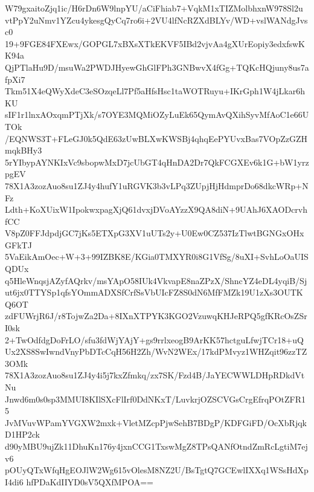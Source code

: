 W79gxaitoZjq1ic/H6rDn6W9lnpYU/aCiFhiab7+VqkM1xTIZMolbhxnW978Sl2u
vtPpY2uNmv1YZcu4ykesgQyCq7ro6i+2VU4lfNcRZXdBLYv/WD+vslWANdgJvsc0
19+9FGE84FXEwx/GOPGL7xBXsXTkEKVF5IBd2vjvAa4gXUrEopiy3edxfswKK94a
QjPTlaHu9D/msuWa2PWDJHyewGhGlFPh3GNBwvX4fGg+TQKcHQjuny8us7afpXi7
Tkm51X4eQWyXdeC3eSOzqeLl7Pf5aHfsHsc1taWOTRuyu+IKrGph1W4jLkar6hKU
sIF1r1lnxAOxqmPTjXk/s7OYE3MQMiOZyLuEk65QymAvQXihSyvMfAoC1e66UTOk
/EQNWS3T+FLeGJ0k5QdE63zUwBLXwKWSBj4qhqEePYUvxBas7VOpZzGZHmqkBHy3
5rYIbypAYNKIxVc9sbopwMxD7jcUbGT4qHnDA2Dr7QkFCGXEv6k1G+bW1yrzpgEV
78X1A3zozAuo8su1ZJ4y4hufY1uRGVK3b3vLPq3ZUpjHjHdmprDo68dkcWRp+NFz
Ldth+KoXUixW1IpokwxpagXjQ61dvxjDVoAYzzX9QA8diN+9UAhJ6XAODcrvhfCC
V8pZ0FFJdpdjGC7jKs5ETXpG3XV1uUTs2y+U0Ew0CZ537IzTlwtBGNGxOHxGFkTJ
5VaEikAmOec+W+3+99IZBK8E/KGia0TMXYR0i8G1VfSg/8uXI+SvhLoOaUISQDUx
q5HleWnqsjAZyfAQrkv/msYApO58IUk4VkvapE8naZPzX/ShncYZ4eDL4yqiB/Sj
ut6jx0TTYSp1qfsYOmmADXSfCrfSsVbUIcFZ8S0dN6MfFMZk19U1zXs3OUTKQ6OT
zdFUWrjR6J/r8TojwZa2Da+8IXnXTPYK3KGO2VzuwqKHJeRPQ5gfKRcOsZSrI0sk
2+TwOdfdgDoFrLO/sfu3fdWjYAjY+gs9rrlxeogB9ArKK57hctguLfwjTCr18+uQ
Ux2XS8SwIwndVnyPbDTcCqH56H2Zh/WvN2WEx/17kdPMvyz1WHZqit96zzTZ3OMk
78X1A3zozAuo8su1ZJ4y4i5j7kxZfmkq/zx7SK/Fzd4B/JaYECWWLDHpRDkdVtNu
Jnwd6m0s0sp3MMUI8KIlSXcFlIrf0DdNKxT/LuvkrjOZSCVGsCrgEfrqPOtZFR15
JvMVuvWPamYVGXW2mxk+VletMZcpPjwSehB7BDgP/KDFGiFD/OcXbRjqkD1HP2ck
d90yMBU9ujZk11DhuKn176y4jxnCCG1TxswMgZ8TPsQANfOtndZmRcLgtiM7ejv6
pOUyQTxWfqHgEOJlW2Wg615vOlesM8NZ2U/BsTgtQ7GCEwlIXXq1WSsHdXpI4di6
hfPDaKdIIYD0sV5QXfMPOA==
